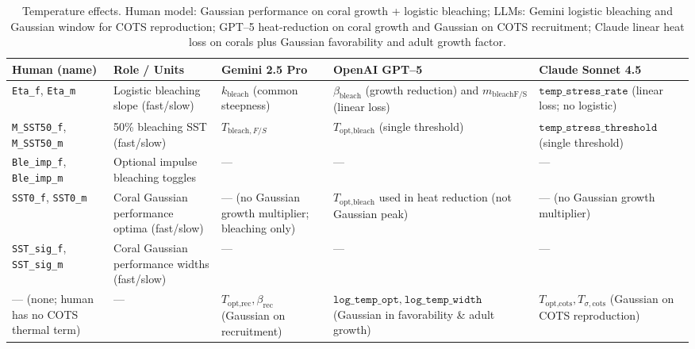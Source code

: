 \begin{landscape}
\begin{table}[htbp]
\centering
\footnotesize
\renewcommand{\arraystretch}{1.15}
\setlength{\tabcolsep}{3pt}
\begin{tabularx}{\linewidth}{@{}l l l l X@{}}
\toprule
\textbf{Human (name)} & \textbf{Role / Units} & \textbf{Gemini 2.5 Pro} & \textbf{OpenAI GPT--5} & \textbf{Claude Sonnet 4.5} \\
\midrule
\texttt{Eta\_f}, \texttt{Eta\_m} & Logistic bleaching slope (fast/slow) &
$k_{\text{bleach}}$ (common steepness) &
$\beta_{\text{bleach}}$ (growth reduction) and $m_{\text{bleachF/S}}$ (linear loss) &
$\texttt{temp\_stress\_rate}$ (linear loss; no logistic) \\
\texttt{M\_SST50\_f}, \texttt{M\_SST50\_m} & 50\% bleaching SST (fast/slow) &
$T_{\text{bleach},F/S}$ &
$T_{\text{opt,bleach}}$ (single threshold) &
$\texttt{temp\_stress\_threshold}$ (single threshold) \\
\texttt{Ble\_imp\_f}, \texttt{Ble\_imp\_m} & Optional impulse bleaching toggles &
--- &
--- &
--- \\
\texttt{SST0\_f}, \texttt{SST0\_m} & Coral Gaussian performance optima (fast/slow) &
--- (no Gaussian growth multiplier; bleaching only) &
$T_{\text{opt,bleach}}$ used in heat reduction (not Gaussian peak) &
--- (no Gaussian growth multiplier) \\
\texttt{SST\_sig\_f}, \texttt{SST\_sig\_m} & Coral Gaussian performance widths (fast/slow) &
--- & --- & --- \\
\addlinespace
--- (none; human has no COTS thermal term) &
--- &
$T_{\text{opt,rec}}, \beta_{\text{rec}}$ (Gaussian on recruitment) &
$\texttt{log\_temp\_opt},\ \texttt{log\_temp\_width}$ (Gaussian in favorability \& adult growth) &
$T_{\text{opt,cots}}, T_{\sigma,\text{cots}}$ (Gaussian on COTS reproduction) \\
\bottomrule
\end{tabularx}
\caption{Temperature effects. Human model: Gaussian performance on coral growth + logistic bleaching; LLMs: Gemini logistic bleaching and Gaussian window for COTS reproduction; GPT--5 heat-reduction on coral growth and Gaussian on COTS recruitment; Claude linear heat loss on corals plus Gaussian favorability and adult growth factor.}
\label{tab:params_temp}
\end{table}
\end{landscape}
